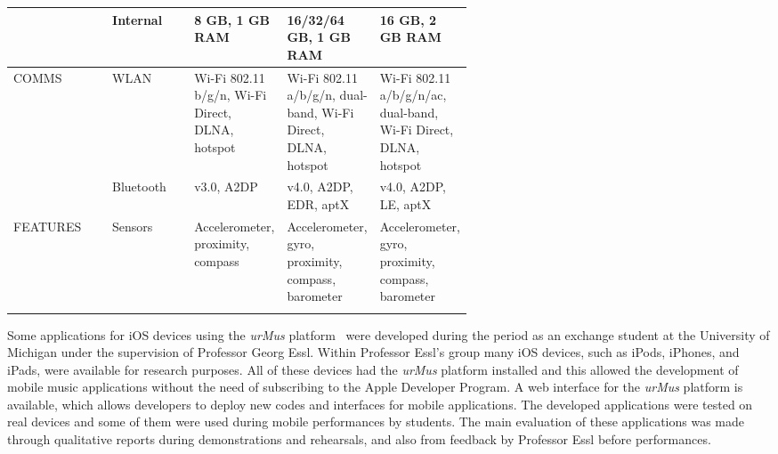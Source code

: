 \begin{longtable}{llp{0.2\linewidth}p{0.2\linewidth}p{0.2\linewidth}}
	& Internal      & 8 GB, 1 GB RAM                                  & 16/32/64 GB, 1 GB RAM                                                                       & 16 GB, 2 GB RAM                                                                                                \\ \hline
	COMMS    & WLAN          & Wi-Fi 802.11 b/g/n, Wi-Fi Direct, DLNA, hotspot & Wi-Fi 802.11 a/b/g/n, dual-band, Wi-Fi Direct, DLNA, hotspot                                & Wi-Fi 802.11 a/b/g/n/ac, dual-band, Wi-Fi Direct, DLNA, hotspot                                                \\
	& Bluetooth     & v3.0, A2DP                                      & v4.0, A2DP, EDR, aptX                                                                       & v4.0, A2DP, LE, aptX                                                                                           \\ \hline
	FEATURES & Sensors       & Accelerometer, proximity, compass               & Accelerometer, gyro, proximity, compass, barometer                                          & Accelerometer, gyro, proximity, compass, barometer                                                             \\ \hline
	\label{tab:gsmarena-lg-s3-z3-short}
\end{longtable}

Some applications for iOS devices using the \textit{\textit{urMus}} platform~\citep{Kim2011urmus} were developed during the period as an exchange student at the University of Michigan under the supervision of Professor Georg Essl.
Within Professor Essl's group many iOS devices, such as iPods, iPhones, and iPads, were available for research purposes.
All of these devices had the \textit{urMus} platform installed and this allowed the development of mobile music applications without the need of subscribing to the Apple Developer Program.
A web interface for the \textit{urMus} platform  is available, which allows developers to deploy new codes and interfaces for mobile applications.
The developed applications were tested on real devices and some of them were used during mobile performances by students.
The main evaluation of these applications was made through qualitative reports during demonstrations and rehearsals, and also from feedback by Professor Essl before performances.

